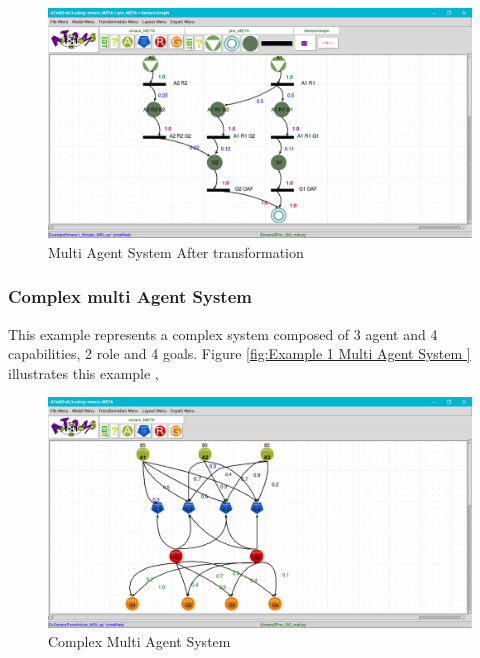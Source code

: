 \begin{figure}[th]
	\centering
 	\includegraphics[scale=0.3]{ch3/img/ex1pns}
	\caption{\label{fig:Multi Agent System After transformation }Multi Agent System After transformation}
\end{figure}  
\subsubsection{ Complex multi Agent System }
This example represents a complex system composed of  3 agent and 4 capabilities, 2 role and 4 goals. Figure \ref{fig:Example 1 Multi Agent System } illustrates this example ,
 


\begin{figure}[th]
	\centering
 	\includegraphics[scale=0.3]{ch3/img/article}
	\caption{\label{fig:Complex Multi Agent System}Complex Multi Agent System}
\end{figure} 

